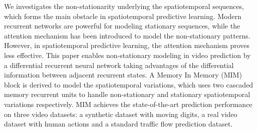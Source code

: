\documentclass[10pt,twocolumn,letterpaper]{article}
\begin{document}
We investigates the non-stationarity underlying the spatiotemporal sequences, which forms the main obstacle in spatiotemporal predictive learning. Modern recurrent networks are powerful for modeling stationary sequences, while the attention mechanism has been introduced to model the non-stationary patterns. However, in spatiotemporal predictive learning, the attention mechanism proves less effective. This paper enables non-stationary modeling in video prediction by a differential recurrent neural network taking advantages of the differential information between adjacent recurrent states. A Memory In Memory (MIM) block is derived to model the spatiotemporal variations, which uses two cascaded memory recurrent units to handle non-stationary and stationary spatiotemporal variations respectively. MIM achieves the state-of-the-art prediction performance on three video datasets: a synthetic dataset with moving digits, a real video dataset with human actions and a standard traffic flow prediction dataset.


{\small


}
\end{document}
